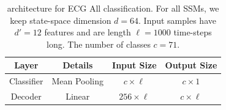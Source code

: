 \begin{table}[]
\centering
\caption{\ourmethod{} architecture for ECG All classification. For all SSMs, we keep state-space dimension $d = 64$. Input samples have $d' = 12$ features and are length $\ell = 1000$ time-steps long. The number of classes $c = 71$.}
\label{tab:spacetime_ecg_all}
\begin{tabular}{@{}c|c|c|c@{}}
Layer       & Details                                                                                                                                                                                                                                                                                                                                                                                                                                                                                                                                      & Input Size        & Output Size       \\ \midrule
Classifier  & Mean Pooling                                                                                                                                                                                                                                                                                                                                                                                                                                                                                                                                 & $c \times \ell$   & $c \times 1$      \\ \midrule
Decoder     & Linear                                                                                                                                                                                                                                                                                                                                                                                                                                                                                                                                       & $256 \times \ell$ & $c \times \ell$   \\ \midrule

\end{tabular}
\end{table}
